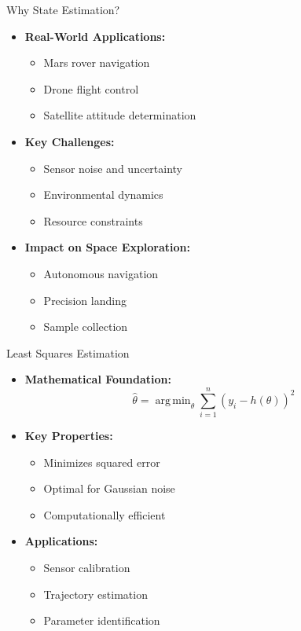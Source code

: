 \documentclass[aspectratio=169]{beamer}
\DeclareMathOperator*{\argmin}{arg\,min}
\begin{document}
\begin{frame}{Why State Estimation?}
    \begin{itemize}
        \item<1-> \textbf{Real-World Applications:}
            \begin{itemize}
                \item Mars rover navigation
                \item Drone flight control
                \item Satellite attitude determination
            \end{itemize}
        \item<2-> \textbf{Key Challenges:}
            \begin{itemize}
                \item Sensor noise and uncertainty
                \item Environmental dynamics
                \item Resource constraints
            \end{itemize}
        \item<3-> \textbf{Impact on Space Exploration:}
            \begin{itemize}
                \item Autonomous navigation
                \item Precision landing
                \item Sample collection
            \end{itemize}
    \end{itemize}
\end{frame}

\begin{frame}{Least Squares Estimation}
    \begin{itemize}
        \item<1-> \textbf{Mathematical Foundation:}
            \[ \hat{\theta} = \argmin_{\theta} \sum_{i=1}^n (y_i - h(\theta))^2 \]
        \item<2-> \textbf{Key Properties:}
            \begin{itemize}
                \item Minimizes squared error
                \item Optimal for Gaussian noise
                \item Computationally efficient
            \end{itemize}
        \item<3-> \textbf{Applications:}
            \begin{itemize}
                \item Sensor calibration
                \item Trajectory estimation
                \item Parameter identification
            \end{itemize}
    \end{itemize}
\end{frame}
\end{document}

